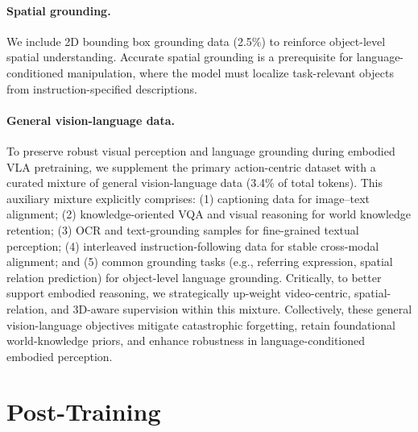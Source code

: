 \documentclass{llmxive}
\begin{document}
\paragraph{Spatial grounding.}
We include 2D bounding box grounding data (2.5\%) to reinforce object-level
spatial understanding. Accurate spatial grounding is a prerequisite for
language-conditioned manipulation, where the model must localize task-relevant
objects from instruction-specified descriptions.

\paragraph{General vision-language data.}
To preserve robust visual perception and language grounding during embodied VLA pretraining, we supplement the primary action-centric dataset with a curated mixture of general vision-language data (3.4\% of total tokens). This auxiliary mixture explicitly comprises: (1) captioning data for image--text alignment; (2) knowledge-oriented VQA and visual reasoning for world knowledge retention; (3) OCR and text-grounding samples for fine-grained textual perception; (4) interleaved instruction-following data for stable cross-modal alignment; and (5) common grounding tasks (e.g., referring expression, spatial relation prediction) for object-level language grounding. 
Critically, to better support embodied reasoning, we strategically up-weight video-centric, spatial-relation, and 3D-aware supervision within this mixture. Collectively, these general vision-language objectives mitigate catastrophic forgetting, retain foundational world-knowledge priors, and enhance robustness in language-conditioned embodied perception.



\section{Post-Training}
\label{sec:post-training}
\end{document}
